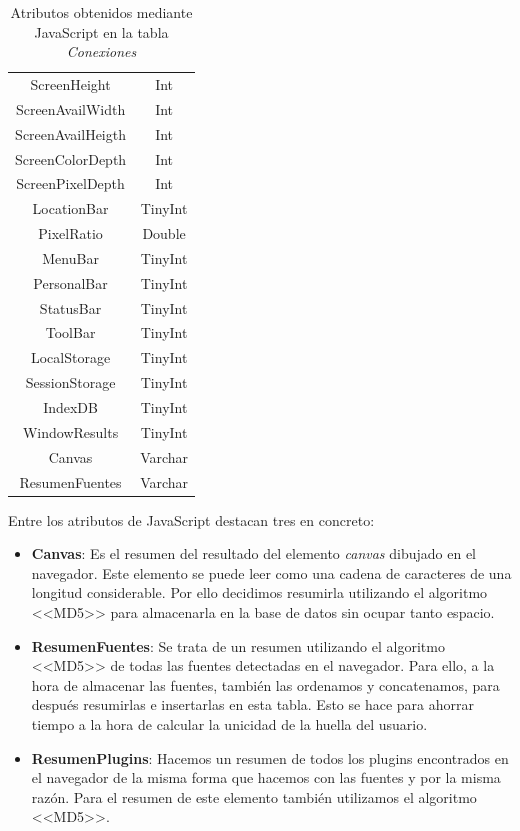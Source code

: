 \begin{itemize}
\begin{table}[tbp]
\begin{minipage}[c]{45mm}
\begin{tabular}{c|c}
                ScreenHeight & Int\\
                ScreenAvailWidth & Int\\
                ScreenAvailHeigth & Int\\
                ScreenColorDepth & Int\\
                ScreenPixelDepth & Int\\
                LocationBar & TinyInt\\
                PixelRatio & Double\\
                MenuBar & TinyInt\\
                PersonalBar & TinyInt\\
                StatusBar & TinyInt\\
                ToolBar & TinyInt\\
                LocalStorage & TinyInt\\
                SessionStorage & TinyInt\\
                IndexDB & TinyInt\\
                WindowResults & TinyInt\\
                Canvas & Varchar\\
                ResumenFuentes & Varchar\\
            \end{tabular}
        \end{minipage}
        \caption{Atributos obtenidos mediante JavaScript en la tabla \textit{Conexiones}}
        \label{tab:resultadosJavascript}
    \end{table}
    Entre los atributos de JavaScript destacan tres en concreto:
    \begin{itemize}
        \item \textbf{Canvas}: Es el resumen del resultado del elemento \textit{canvas} dibujado en el navegador. Este elemento se puede leer como una cadena de caracteres de una longitud considerable. Por ello decidimos resumirla utilizando el algoritmo <<MD5>> para almacenarla en la base de datos sin ocupar tanto espacio.
        \item \textbf{ResumenFuentes}: Se trata de un resumen utilizando el algoritmo <<MD5>> de todas las fuentes detectadas en el navegador. Para ello, a la hora de almacenar las fuentes, también las ordenamos y concatenamos, para después resumirlas e insertarlas en esta tabla. Esto se hace para ahorrar tiempo a la hora de calcular la unicidad de la huella del usuario.
        \item \textbf{ResumenPlugins}: Hacemos un resumen de todos los plugins encontrados en el navegador de la misma forma que hacemos con las fuentes y por la misma razón. Para el resumen de este elemento también utilizamos el algoritmo <<MD5>>.

\end{itemize}
\end{itemize}
